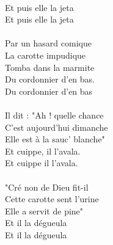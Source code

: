 {\\Et puis elle la jeta
\\
{Et puis elle la jeta}
\\\\Par un hasard comique
\\La carotte impudique
\\Tomba dans la marmite
\\Du cordonnier d'en bas.
\\
{Du cordonnier d'en bas}
\\\\Il dit : "Ah ! quelle chance
\\C'est aujourd'hui dimanche
\\Elle est à la sauc' blanche"
\\Et cuippe, il l'avala.
\\
{Et cuippe il l'avala.}
\\\\"Cré non de Dieu fit-il
\\Cette carotte sent l'urine
\\Elle a servit de pine"
\\Et il la dégueula
\\
{Et il la dégueula}
}

\breakpage